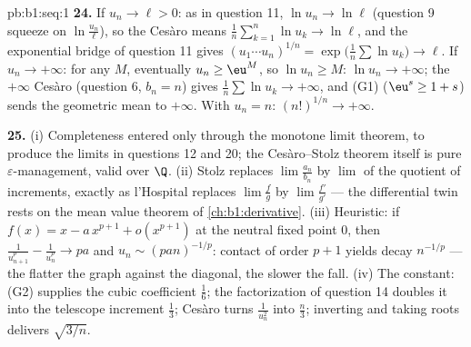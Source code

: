 \begin{solution}{pb:b1:seq:1}
\textbf{24.} If $u_n \to \ell > 0$: as in question 11, $\ln u_n
\to \ln\ell$ (question 9 squeeze on $\ln\frac{u_n}{\ell}$), so
the Ces\`aro means $\frac1n\sum_{k=1}^n \ln u_k \to \ln\ell$,
and the exponential bridge of question 11 gives $(u_1\cdots
u_n)^{1/n} = \exp\bigl(\frac1n\sum\ln u_k\bigr) \to \ell$. If
$u_n \to +\infty$: for any $M$, eventually $u_n \geq \eu^M$, so
$\ln u_n \geq M$: $\ln u_n \to +\infty$; the $+\infty$ Ces\`aro
(question 6, $b_n = n$) gives $\frac1n\sum \ln u_k \to
+\infty$, and (G1) ($\eu^s \geq 1 + s$) sends the geometric mean
to $+\infty$. With $u_n = n$: $(n!)^{1/n} \to +\infty$.

\textbf{25.} (i) Completeness entered only through the monotone
limit theorem, to produce the limits in questions 12 and 20;
the Ces\`aro--Stolz theorem itself is pure
$\varepsilon$-management, valid over $\Q$. (ii) Stolz replaces
$\lim \frac{a_n}{b_n}$ by $\lim$ of the quotient of increments,
exactly as l'Hospital replaces $\lim\frac fg$ by
$\lim\frac{f'}{g'}$ --- the differential twin rests on the mean
value theorem of \cref{ch:b1:derivative}. (iii) Heuristic: if
$f(x) = x - a\,x^{p+1} + o(x^{p+1})$ at the neutral fixed point
$0$, then $\frac{1}{u_{n+1}^p} - \frac{1}{u_n^p} \to pa$ and
$u_n \sim (pan)^{-1/p}$: contact of order $p + 1$ yields decay
$n^{-1/p}$ --- the flatter the graph against the diagonal, the
slower the fall. (iv) The constant: (G2) supplies the cubic
coefficient $\frac16$; the factorization of question 14 doubles
it into the telescope increment $\frac13$; Ces\`aro turns
$\frac{1}{u_n^2}$ into $\frac n3$; inverting and taking roots
delivers $\sqrt{3/n}$.
\end{solution}
